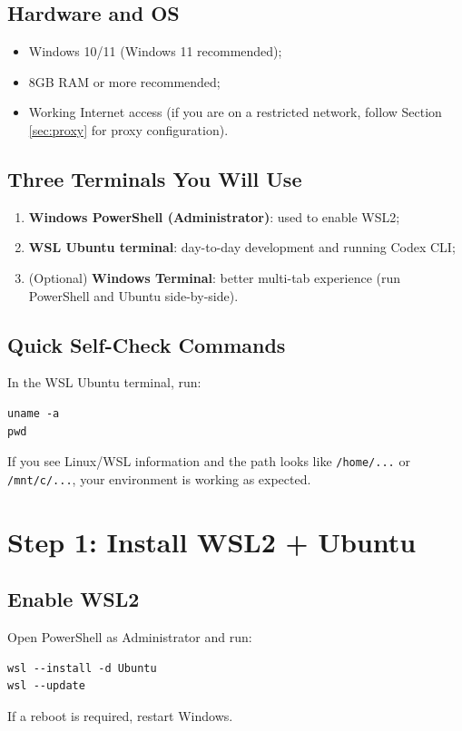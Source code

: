 \documentclass[11pt,a4paper]{article}
\begin{document}
\subsection{Hardware and OS}
\begin{itemize}[leftmargin=1.5em]
  \item Windows 10/11 (Windows 11 recommended);
  \item 8GB RAM or more recommended;
  \item Working Internet access (if you are on a restricted network, follow Section \ref{sec:proxy} for proxy configuration).
\end{itemize}

\subsection{Three Terminals You Will Use}
\begin{enumerate}[leftmargin=1.7em]
  \item \textbf{Windows PowerShell (Administrator)}: used to enable WSL2;
  \item \textbf{WSL Ubuntu terminal}: day-to-day development and running Codex CLI;
  \item (Optional) \textbf{Windows Terminal}: better multi-tab experience (run PowerShell and Ubuntu side-by-side).
\end{enumerate}

\subsection{Quick Self-Check Commands}
In the WSL Ubuntu terminal, run:
\begin{lstlisting}
uname -a
pwd
\end{lstlisting}
If you see Linux/WSL information and the path looks like \texttt{/home/...} or \texttt{/mnt/c/...}, your environment is working as expected.

\section{Step 1: Install WSL2 + Ubuntu}
\subsection{Enable WSL2}
Open PowerShell as Administrator and run:
\begin{lstlisting}
wsl --install -d Ubuntu
wsl --update
\end{lstlisting}
If a reboot is required, restart Windows.
\end{document}
